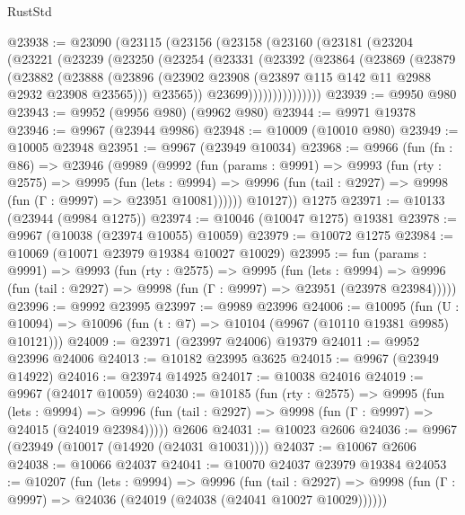\begin{lexlean}{RustStd}
\begin{coremodule}
@23938 := @23090
    (@23115
      (@23156
        (@23158
          (@23160
            (@23181
              (@23204
                (@23221
                  (@23239
                    (@23250
                      (@23254
                        (@23331
                          (@23392
                            (@23864
                              (@23869
                                (@23879
                                  (@23882
                                    (@23888
                                      (@23896
                                        (@23902
                                          @23908
                                          (@23897 @115 @142 @11 @2988 @2932 @23908 @23565)))
                                      @23565))
                                  @23699)))))))))))))))
@23939 := @9950 @980
@23943 := @9952 (@9956 @980) (@9962 @980)
@23944 := @9971 @19378
@23946 := @9967 (@23944 @9986)
@23948 := @10009 (@10010 @980)
@23949 := @10005 @23948
@23951 := @9967 (@23949 @10034)
@23968 := @9966
    (fun (fn : @86) =>
    @23946
      (@9989
        (@9992
          (fun (params : @9991) =>
          @9993
            (fun (rty : @2575) =>
            @9995
              (fun (lets : @9994) =>
              @9996 (fun (tail : @2927) => @9998 (fun (Γ : @9997) => @23951 @10081))))))
        @10127))
    @1275
@23971 := @10133 (@23944 (@9984 @1275))
@23974 := @10046 (@10047 @1275) @19381
@23978 := @9967 (@10038 (@23974 @10055) @10059)
@23979 := @10072 @1275
@23984 := @10069 (@10071 @23979 @19384 @10027 @10029)
@23995 := fun (params : @9991) =>
  @9993
    (fun (rty : @2575) =>
    @9995
      (fun (lets : @9994) =>
      @9996 (fun (tail : @2927) => @9998 (fun (Γ : @9997) => @23951 (@23978 @23984)))))
@23996 := @9992 @23995
@23997 := @9989 @23996
@24006 := @10095
    (fun (U : @10094) => @10096 (fun (t : @7) => @10104 (@9967 (@10110 @19381 @9985) @10121)))
@24009 := @23971 (@23997 @24006) @19379
@24011 := @9952 @23996 @24006
@24013 := @10182 @23995 @3625
@24015 := @9967 (@23949 @14922)
@24016 := @23974 @14925
@24017 := @10038 @24016
@24019 := @9967 (@24017 @10059)
@24030 := @10185
    (fun (rty : @2575) =>
    @9995
      (fun (lets : @9994) =>
      @9996 (fun (tail : @2927) => @9998 (fun (Γ : @9997) => @24015 (@24019 @23984)))))
    @2606
@24031 := @10023 @2606
@24036 := @9967 (@23949 (@10017 (@14920 (@24031 @10031))))
@24037 := @10067 @2606
@24038 := @10066 @24037
@24041 := @10070 @24037 @23979 @19384
@24053 := @10207
    (fun (lets : @9994) =>
    @9996
      (fun (tail : @2927) =>
      @9998 (fun (Γ : @9997) => @24036 (@24019 (@24038 (@24041 @10027 @10029))))))

\end{coremodule}
\end{lexlean}
